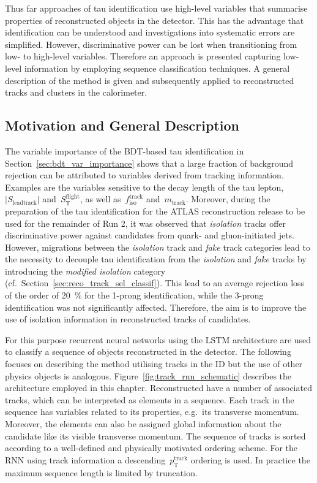 Thus far approaches of tau identification use high-level variables that
summarise properties of reconstructed objects in the detector. This has the
advantage that identification can be understood and investigations into
systematic errors are simplified. However, discriminative power can be lost when
transitioning from low- to high-level variables. Therefore an approach is
presented capturing low-level information by employing sequence classification
techniques. A general description of the method is given and subsequently
applied to reconstructed tracks and clusters in the calorimeter.

\subsection{Motivation and General Description}
\label{sec:rnn_descr}

The variable importance of the BDT-based tau identification in
Section~\ref{sec:bdt_var_importance} shows that a large fraction of background
rejection can be attributed to variables derived from tracking information.
Examples are the variables sensitive to the decay length of the tau lepton,
$|S_\text{leadtrack}|$ and~$S_\text{T}^\text{flight}$, as well
as~$f_\text{iso}^\text{track}$ and~$m_\text{track}$. Moreover, during the
preparation of the tau identification for the ATLAS reconstruction release to be
used for the remainder of Run 2, it was observed that \emph{isolation} tracks
offer discriminative power against \tauhadvis candidates from quark- and
gluon-initiated jets. However, migrations between the \emph{isolation} track and
\emph{fake} track categories lead to the necessity to decouple tau
identification from the \emph{isolation} and \emph{fake} tracks by introducing
the \emph{modified isolation} category (cf.\
Section~\ref{sec:reco_track_sel_classif}). This lead to an average rejection
loss of the order of \SI{20}{\percent} for the 1-prong identification, while the
3-prong identification was not significantly affected. Therefore, the aim is to
improve the use of isolation information in reconstructed tracks of \tauhadvis
candidates.

For this purpose recurrent neural networks using the LSTM architecture are used
to classify a sequence of objects reconstructed in the detector. The following
focuses on describing the method utilising tracks in the ID but the use of other
physics objects is analogous. Figure~\ref{fig:track_rnn_schematic} describes the
architecture employed in this chapter. Reconstructed \tauhadvis have a number of
associated tracks, which can be interpreted as elements in a sequence. Each
track in the sequence has variables related to its properties, e.g.\ its
transverse momentum. Moreover, the elements can also be assigned global
information about the \tauhadvis candidate like its visible transverse momentum.
The sequence of tracks is sorted according to a well-defined and physically
motivated ordering scheme. For the RNN using track information a
descending~$p_\text{T}^\text{track}$ ordering is used. 
In practice the maximum sequence length is limited by truncation.

